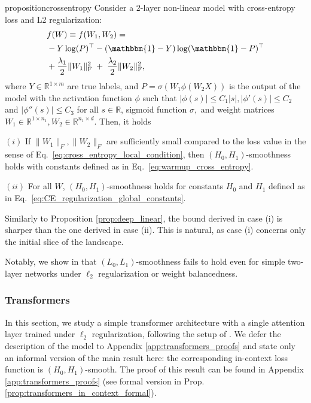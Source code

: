 \documentclass[a4paper,11pt]{article}
\newcommand{\R}{\mathbb{R}}
\newcommand{\1}{\mathbbm{1}}
\theoremstyle{plain}
\begin{document}
\begin{restatable}{proposition}{crossentropy}\label{prop:crossentropy}
    Consider a $2$-layer non-linear model with cross-entropy loss and L2 regularization:
    \begin{align*}
        &f(W) \equiv f(W_1, W_2) = \\& -Y \log(P)^\top-(\1-Y) \log(\1-P)^\top  \\& + \frac{\lambda_1}{2} \|W_1\|_{\rm F}^2 \;+\; \frac{\lambda_2}{2} \|W_2\|_{\rm F}^2,
    \end{align*}
where $Y\in\R^{1\times m}$ are true labels, and $P=\sigma(W_1 \phi(W_2 X))$ is the output of the model with the activation function $\phi$ such that $|\phi(s)| \leq C_1 |s|, |\phi'(s)| \leq C_2$ and $|\phi''(s)| \leq C_3$ for all $s\in\R$, sigmoid function $\sigma,$ and weight matrices $W_1\in\R^{1\times n_1}, W_2\in\R^{n_1 \times d}$.
Then, it holds

$(i)$ If $\|W_1\|_F, \|W_2\|_F$ are sufficiently small compared to the loss value in the sense of Eq.~\eqref{eq:cross_entropy_local_condition},
then $(H_0,H_1)$-smoothness holds
with constants defined as in Eq.~\eqref{eq:warmup_cross_entropy}.

$(ii)$ For all $W$, $(H_0,H_1)$-smoothness holds for constants $H_0$ and $H_1$ defined as in Eq.~\eqref{eq:CE_regularization_global_constants}.

\end{restatable}


Similarly to Proposition \ref{prop:deep_linear}, the bound derived in case (i) is sharper than the one derived in case (ii). This is natural, as case (i) concerns only the initial slice of the landscape.


Notably, we show in  that $(L_0, L_1)$-smoothness fails to hold even for simple two-layer networks under $\ell_2$ regularization or weight balancedness.


\subsubsection{Transformers}
\label{sec:theory_transformers}

In this section, we study a simple transformer architecture with a single attention layer trained under $\ell_2$ regularization, following the setup of \citet{zhang2024trained}. We defer the description of the model to Appendix \ref{app:transformers_proofs} and state only an informal version of the main result here: the corresponding in-context loss function is $(H_0, H_1)$-smooth. The proof of this result can be found in Appendix \ref{app:transformers_proofs} (see formal version in Prop. \ref{prop:transformers_in_context_formal}).
\end{document}
